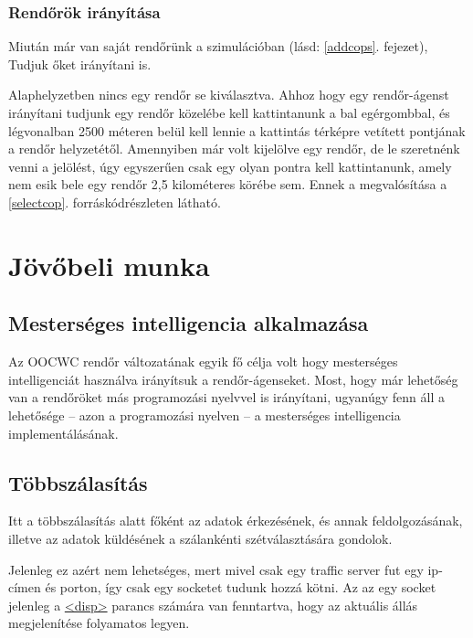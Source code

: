 \documentclass[a4paper,12pt]{report}
\begin{document}
\subsection{Rendőrök irányítása}
\label{controlcops}

Miután már van saját rendőrünk a szimulációban (lásd: \ref{addcops}. fejezet), Tudjuk őket irányítani is.

\vspace{2mm}
Alaphelyzetben nincs egy rendőr se kiválasztva. Ahhoz hogy egy rendőr-ágenst irányítani tudjunk egy rendőr közelébe kell kattintanunk a bal egérgombbal, és légvonalban 2500 méteren belül kell lennie a kattintás térképre vetített pontjának a rendőr helyzetétől. Amennyiben már volt kijelölve egy rendőr, de le szeretnénk venni a jelölést, úgy egyszerűen csak egy olyan pontra kell kattintanunk, amely nem esik bele egy rendőr 2,5 kilométeres körébe sem. Ennek a megvalósítása a \ref{selectcop}. forráskódrészleten látható.



\newpage
\chapter{Jövőbeli munka}
\label{futureworks}

\section{Mesterséges intelligencia alkalmazása}

Az OOCWC rendőr változatának egyik fő célja volt hogy mesterséges intelligenciát használva irányítsuk a rendőr-ágenseket. Most, hogy már lehetőség van a rendőröket más programozási nyelvvel is irányítani, ugyanúgy fenn áll a lehetősége -- azon a programozási nyelven -- a mesterséges intelligencia implementálásának.

\section{Többszálasítás}

Itt a többszálasítás alatt főként az adatok érkezésének, és annak feldolgozásának, illetve az adatok küldésének a szálankénti szétválasztására gondolok. 

\vspace{2mm}
Jelenleg ez azért nem lehetséges, mert mivel csak egy traffic server fut egy ip-címen és porton, így csak egy socketet tudunk hozzá kötni. Az az egy socket jelenleg a \url{<disp>} parancs számára van fenntartva, hogy az aktuális állás megjelenítése folyamatos legyen. 
\end{document}
